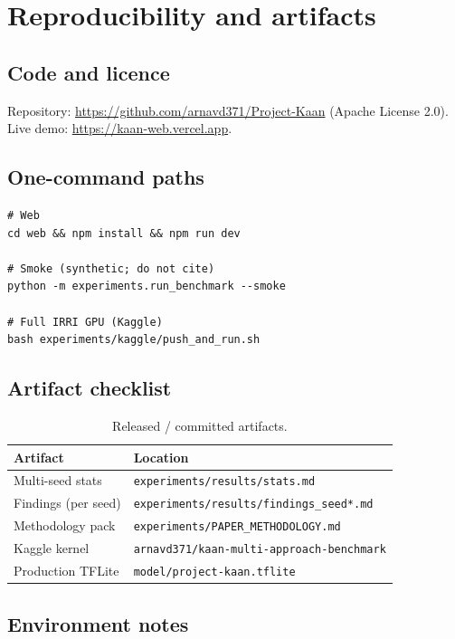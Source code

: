 \section{Reproducibility and artifacts}
\label{sec:repro}

\subsection{Code and licence}
Repository: \url{https://github.com/arnavd371/Project-Kaan} (Apache License 2.0).
Live demo: \url{https://kaan-web.vercel.app}.

\subsection{One-command paths}
\begin{verbatim}
# Web
cd web && npm install && npm run dev

# Smoke (synthetic; do not cite)
python -m experiments.run_benchmark --smoke

# Full IRRI GPU (Kaggle)
bash experiments/kaggle/push_and_run.sh
\end{verbatim}

\subsection{Artifact checklist}
\begin{table}[H]
\centering
\caption{Released / committed artifacts.}
\label{tab:artifacts}
\begin{tabular}{@{}ll@{}}
\toprule
Artifact & Location \\
\midrule
Multi-seed stats & \texttt{experiments/results/stats.md} \\
Findings (per seed) & \texttt{experiments/results/findings\_seed*.md} \\
Methodology pack & \texttt{experiments/PAPER\_METHODOLOGY.md} \\
Kaggle kernel & \texttt{arnavd371/kaan-multi-approach-benchmark} \\
Production TFLite & \texttt{model/project-kaan.tflite} \\
\bottomrule
\end{tabular}
\end{table}

\subsection{Environment notes}
